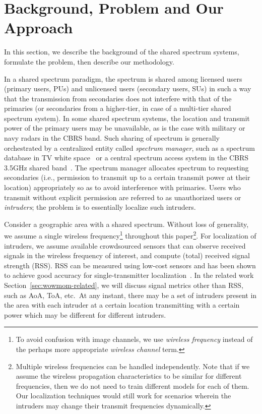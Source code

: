 \section{Background, \mtl Problem and Our Approach}
\label{sec:problem}
\label{sec:prob-def}

In this section, we describe the background of the shared spectrum systems,
formulate the \mtl problem, then describe our methodology. 

 In a shared spectrum paradigm, the
spectrum is shared among licensed users (primary users, PUs) and
unlicensed users (secondary users, SUs) in such a way that the
transmission from secondaries does not interfere with that of the
primaries (or secondaries from a higher-tier, in case of a multi-tier
shared spectrum system). In some shared spectrum systems,
the location and transmit power of the primary users may be
unavailable, as is the case with military or navy radars in the CBRS band.
Such sharing of spectrum is generally orchestrated by a centralized
entity called {\em spectrum manager}, such as a spectrum
database in TV white
space~\cite{sas-paper} or a central spectrum access system in
the CBRS 3.5GHz shared band~\cite{milind2015dyspan}. The spectrum
manager allocates spectrum to requesting secondaries (i.e., permission
to transmit up to a certain transmit power at their location) appropriately
so as to avoid interference with primaries.
Users who transmit without explicit permission are referred to as 
unauthorized users or {\em intruders}; the \mtl problem is to essentially
localize such intruders. 

  Consider a geographic
area with a shared spectrum. Without loss of generality, we assume a
single wireless frequency\footnote{To avoid confusion with image channels, we use {\em wireless frequency} instead of the perhaps more appropriate {\em wireless channel} term.} throughout this paper\footnote{Multiple wireless frequencies can be handled independently. 
Note that if we assume the wireless propagation characteristics to be similar for different frequencies, then we do not need to train different models for each of them. Our localization techniques would still work
for scenarios wherein the intruders may change their transmit frequencies dynamically.}.
For localization of intruders, we assume
available crowdsourced sensors that can observe received signals in the wireless frequency of interest, and compute (total) received signal strength (RSS).
RSS can be measured using low-cost sensors and has been shown to achieve good accuracy for single-transmitter localization~\cite{infocom00-radar}.
In the related work Section~\ref{sec:wowmom-related}, we will discuss signal metrics other than RSS, such as AoA, ToA, etc.~At any instant, there may be a set of intruders
present in the area with each intruder at a certain location transmitting
with a certain power which may be different for different intruders.

